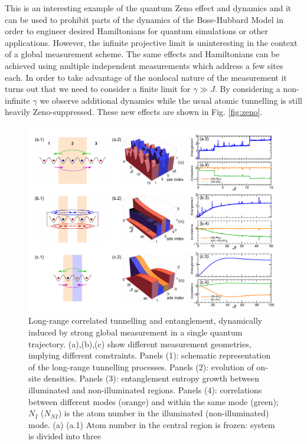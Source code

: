 This is an interesting example of the quantum Zeno effect and dynamics
and it can be used to prohibit parts of the dynamics of the
Bose-Hubbard Model in order to engineer desired Hamiltonians for
quantum simulations or other applications. However, the infinite
projective limit is uninteresting in the context of a global
measurement scheme. The same effects and Hamiltonians can be achieved
using multiple independent measurements which address a few sites
each. In order to take advantage of the nonlocal nature of the
measurement it turns out that we need to consider a finite limit for
$\gamma \gg J$. By considering a non-infinite $\gamma$ we observe
additional dynamics while the usual atomic tunnelling is still heavily
Zeno-suppressed. These new effects are shown in Fig. \ref{fig:zeno}.

\begin{figure}[hbtp!]
  \includegraphics[width=\textwidth]{Zeno.pdf}
  \caption[Emergent Long-Range Correlated Tunnelling]{ Long-range
    correlated tunnelling and entanglement, dynamically induced by
    strong global measurement in a single quantum
    trajectory. (a),(b),(c) show different measurement geometries,
    implying different constraints. Panels (1): schematic
    representation of the long-range tunnelling processes. Panels (2):
    evolution of on-site densities. Panels (3): entanglement entropy
    growth between illuminated and non-illuminated regions. Panels
    (4): correlations between different modes (orange) and within the
    same mode (green); $N_I$ ($N_{NI}$) is the atom number in the
    illuminated (non-illuminated) mode.  (a) (a.1) Atom number in the
    central region is frozen: system is divided into three
}
\end{figure}
